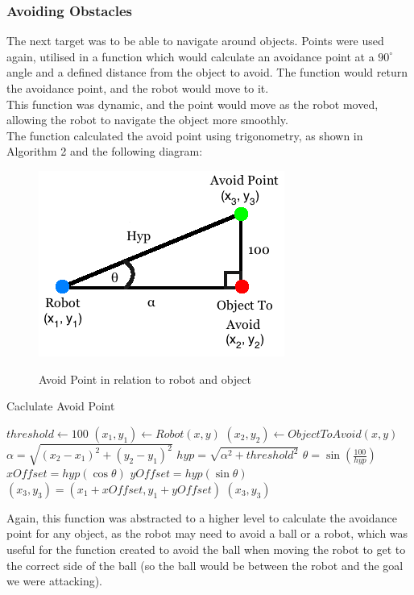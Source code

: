 \subsubsection{Avoiding Obstacles}
The next target was to be able to navigate around objects. Points were used again, utilised in a function which would calculate an avoidance point at a $90^{\circ}$ angle and a defined distance from the object to avoid. The function would return the avoidance point, and the robot would move to it. \\
This function was dynamic, and the point would move as the robot moved, allowing the robot to navigate the object more smoothly.\\
The function calculated the avoid point using trigonometry, as shown in Algorithm 2 and the following diagram:
\begin{center}
\begin{figure}[htp]
\leavevmode
\includegraphics[scale=0.6]{images/AvoidPoints.png}
\label{fig:AvoidPointDiagram}
\caption{Avoid Point in relation to robot and object}
\end{figure}
\end{center}

\begin{algorithm}
\caption{Caclulate Avoid Point}
\label{avoidPoint}
\begin{algorithmic}[1]
\STATE $threshold \gets 100$
\STATE $(x_{1}, y_{1}) \gets Robot (x, y)$
\STATE $(x_{2}, y_{2}) \gets Object To Avoid (x, y)$
\STATE $\alpha = \sqrt{(x_{2} - x_{1})^{2} + (y_{2} - y_{1})^{2}}$
\STATE $hyp = \sqrt{\alpha^{2} + threshold^{2}}$
\STATE $\theta = \sin(\frac{100}{hyp})$
\STATE $xOffset = hyp(\cos\theta)$
\STATE $yOffset = hyp(\sin\theta)$
\STATE $(x_{3}, y_{3}) = (x_{1} + xOffset, y_{1} + yOffset)$
\RETURN $(x_{3}, y_{3})$
\end{algorithmic}
\end{algorithm}

Again, this function was abstracted to a higher level to calculate the avoidance point for any object, as the robot may need to avoid a ball or a robot, which was useful for the function created to avoid the ball when moving the robot to get to the correct side of the ball (so the ball would be between the robot and the goal we were attacking). \linebreak

